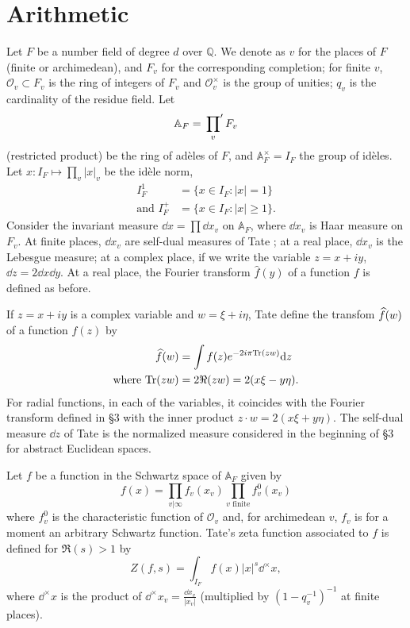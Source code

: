 \section{Arithmetic}

Let $F$ be a number field of degree $d$ over $\mathbb{Q}$.
We denote as $v$ for the places of $F$ (finite or archimedean), and $F_{v}$ for the corresponding completion; for finite $v$, $\mathcal{O}_{v} \subset F_{v}$ is the ring of integers of $F_{v}$ and $\mathcal{O}_{v}^\times$ is the group of unities; $q_{v}$ is the cardinality of the residue field.
Let
\[
    \mathbb{A}_{F} = \sideset{}{'}\prod_{v} F_{v}
\]
(restricted product) be the ring of ad\`eles of $F$, and $\mathbb{A}_{F}^\times = I_{F}$ the group of id\`eles.
Let $x: I_{F} \mapsto \prod_{v} |x|_{v}$ be the id\`ele norm,
\begin{align*}
    I_F^{1} &= \{ x \in I_F: |x| = 1\} \\
    \text{and }I_{F}^{+} &= \{ x \in I_F: |x| \geq 1\}.
\end{align*}
Consider the invariant measure $\dd x = \prod \dd x_v$ on $\mathbb{A}_F$, where $\dd x_v$ is Haar measure on $F_v$.
At finite places, $\dd x_v$ are self-dual measures of Tate \cite{tate1967fourier}; at a real place, $\dd x_v$ is the Lebesgue measure; at a complex place, if we write the variable $z = x + iy$, $\dd z = 2 \dd x \dd y$.
At a real place, the Fourier transform $\hat{f}(y)$ of a function $f$ is defined as before.

If $z = x + iy$ is a complex variable and $w = \xi + i \eta$, Tate define the transfom $\widehat{f}(w)$ of a function $f(z)$ by
\begin{align*}
    \widehat{f}(w) &= \int f(z) e^{-2 i \pi \mathrm{Tr}(zw)} \mathrm{d} z \\
    \text{where } \mathrm{Tr}(zw) &= 2 \Re(zw) = 2(x \xi - y \eta).
\end{align*}
For radial functions, in each of the variables, it coincides with the Fourier transform defined in \S 3 with the inner product $z \cdot w = 2(x\xi + y\eta)$.
The self-dual measure $\dd z$ of Tate is the normalized measure considered in the beginning of \S 3 for abstract Euclidean spaces.

Let $f$ be a function in the Schwartz space of $\mathbb{A}_F$ given by
\begin{equation}
    \label{eqn:4.1}
    f(x) = \prod_{v|\infty} f_{v}(x_{v}) \prod_{v\text{ finite}} f_{v}^{0}(x_{v})
\end{equation}
where $f_{v}^{0}$ is the characteristic function of $\mathcal{O}_{v}$ and, for archimedean $v$, $f_{v}$ is for a moment an arbitrary Schwartz function.
Tate's zeta function associated to $f$ is defined for $\Re(s) > 1$ by
\[
    Z(f, s) = \int_{I_F} f(x) |x|^{s} \dd^\times x,
\]
where $\dd^\times x$ is the product of $\dd^\times x_v = \frac{\dd x_v}{|x_v|}$ (multiplied by $(1 - q_{v}^{-1})^{-1}$ at finite places).

